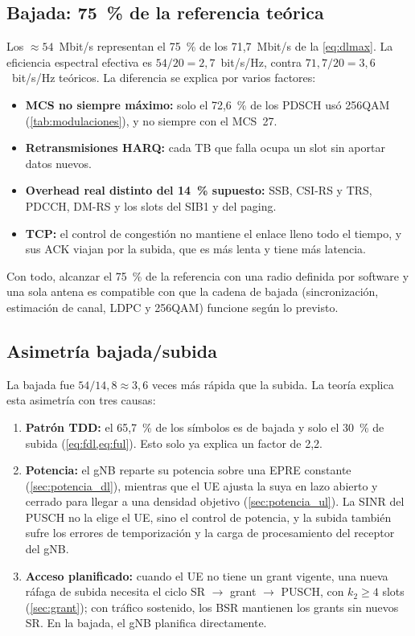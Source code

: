 \subsection{Bajada: 75~\% de la referencia teórica}
Los $\approx 54$~Mbit/s representan el 75~\% de los 71,7~Mbit/s de la \cref{eq:dlmax}. La eficiencia espectral efectiva es $54/20 = 2{,}7$~bit/s/Hz, contra $71{,}7/20 = 3{,}6$~bit/s/Hz teóricos. La diferencia se explica por varios factores:
\begin{itemize}
  \item \textbf{MCS no siempre máximo:} solo el 72,6~\% de los PDSCH usó 256QAM (\cref{tab:modulaciones}), y no siempre con el MCS~27.
  \item \textbf{Retransmisiones HARQ:} cada TB que falla ocupa un slot sin aportar datos nuevos.
  \item \textbf{Overhead real distinto del 14~\% supuesto:} SSB, CSI-RS y TRS, PDCCH, DM-RS y los slots del SIB1 y del paging.
  \item \textbf{TCP:} el control de congestión no mantiene el enlace lleno todo el tiempo, y sus ACK viajan por la subida, que es más lenta y tiene más latencia.
\end{itemize}
Con todo, alcanzar el 75~\% de la referencia con una radio definida por software y una sola antena es compatible con que la cadena de bajada (sincronización, estimación de canal, LDPC y 256QAM) funcione según lo previsto.

\subsection{Asimetría bajada/subida}
La bajada fue $54/14{,}8\approx 3{,}6$ veces más rápida que la subida. La teoría explica esta asimetría con tres causas:
\begin{enumerate}
  \item \textbf{Patrón TDD:} el 65,7~\% de los símbolos es de bajada y solo el 30~\% de subida (\cref{eq:fdl,eq:ful}). Esto solo ya explica un factor de 2,2.
  \item \textbf{Potencia:} el gNB reparte su potencia sobre una EPRE constante (\cref{sec:potencia_dl}), mientras que el UE ajusta la suya en lazo abierto y cerrado para llegar a una densidad objetivo (\cref{sec:potencia_ul}). La SINR del PUSCH no la elige el UE, sino el control de potencia, y la subida también sufre los errores de temporización y la carga de procesamiento del receptor del gNB.
  \item \textbf{Acceso planificado:} cuando el UE no tiene un grant vigente, una nueva ráfaga de subida necesita el ciclo SR $\to$ grant $\to$ PUSCH, con $k_2\ge 4$ slots (\cref{sec:grant}); con tráfico sostenido, los BSR mantienen los grants sin nuevos SR. En la bajada, el gNB planifica directamente.
\end{enumerate}

